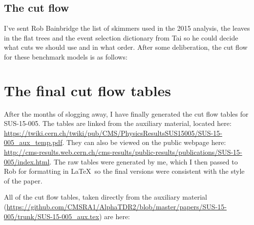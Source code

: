 \subsection{The cut flow}

I've sent Rob Bainbridge the list of skimmers used in the 2015 analysis, the leaves in the flat trees and the event selection dictionary from Tai so he could decide what cuts we should use and in what order. After some deliberation, the cut flow for these benchmark models is as follows:




\section{The final cut flow tables}

After the months of slogging away, I have finally generated the cut flow tables for SUS-15-005. The tables are linked from the auxiliary material, located here: \url{https://twiki.cern.ch/twiki/pub/CMS/PhysicsResultsSUS15005/SUS-15-005_aux_temp.pdf}. They can also be viewed on the public webpage here: \url{http://cms-results.web.cern.ch/cms-results/public-results/publications/SUS-15-005/index.html}. The raw tables were generated by me, which I then passed to Rob for formatting in \LaTeX\ so the final versions were consistent with the style of the paper.

All of the cut flow tables, taken directly from the auxiliary material (\url{https://github.com/CMSRA1/AlphaTDR2/blob/master/papers/SUS-15-005/trunk/SUS-15-005_aux.tex}) are here:

